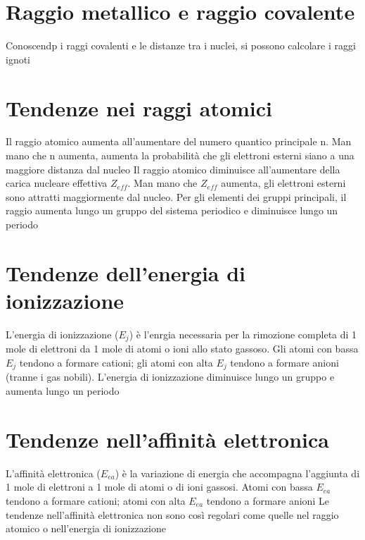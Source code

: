 \documentclass[a4paper,11pt]{report}
\begin{document}
\section{Raggio metallico e raggio covalente}

Conoscendp i raggi covalenti e le distanze tra i nuclei, si possono calcolare i raggi ignoti

\section{Tendenze nei raggi atomici}

Il raggio atomico aumenta all'aumentare del numero quantico principale n. Man mano che n aumenta, aumenta la probabilità che gli elettroni esterni siano a una maggiore distanza dal nucleo \newline
Il raggio atomico diminuisce all'aumentare della carica nucleare effettiva $Z_{eff}$. Man mano che $Z_{eff}$ aumenta, gli elettroni esterni sono attratti maggiormente dal nucleo. \newline
Per gli elementi dei gruppi principali, il raggio aumenta lungo un gruppo del sistema periodico e diminuisce lungo un periodo

\section{Tendenze dell'energia di ionizzazione}

L'energia di ionizzazione ($E_j$) è l'enrgia necessaria per la rimozione completa di 1 mole di elettroni da 1 mole di atomi o ioni allo stato gassoso. Gli atomi con bassa $E_j$ tendono a formare cationi; gli atomi con alta $E_j$ tendono a formare anioni (tranne i gas nobili). L'energia di ionizzazione diminuisce lungo un gruppo e aumenta lungo un periodo

\section{Tendenze nell'affinità elettronica}

L'affinità elettronica ($E_{ea}$) è la variazione di energia che accompagna l'aggiunta di 1 mole di elettroni a 1 mole di atomi o di ioni gassosi. Atomi con bassa $E_{ea}$ tendono a formare cationi; atomi con alta $E_{ea}$ tendono a formare anioni \newline
Le tendenze nell'affinità elettronica non sono così regolari come quelle nel raggio atomico o nell'energia di ionizzazione 
\end{document}
